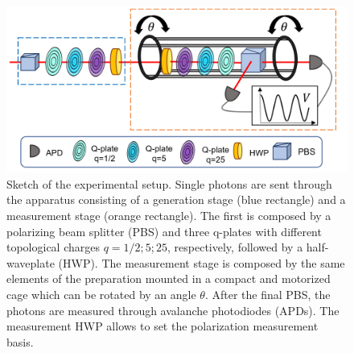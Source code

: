 \documentclass[aps,pra,twocolumn,notitlepage,superscriptaddress]{revtex4-1}
\begin{document}
\begin{figure}[!t]
	\includegraphics[width=0.99\columnwidth]{setup.png}
	\caption{Sketch of the experimental setup. Single photons are sent through the apparatus consisting of a generation stage (blue rectangle) and a measurement stage (orange rectangle). The first is composed by a polarizing beam splitter (PBS) and three q-plates with different topological charges $q = 1/2; 5; 25$, respectively, followed by a half-waveplate (HWP).
	 The measurement stage is composed by the same elements of the preparation mounted in a compact and motorized cage which can be rotated by an angle $\theta$. After the final PBS, the photons are measured through avalanche photodiodes (APDs). The measurement HWP allows to set the polarization measurement basis.}
	\label{fig:setup}
\end{figure}
%
\end{document}
